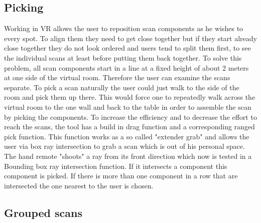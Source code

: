 \documentclass[hyperref,english,bachelorofscience,bibnum]{cgvpub}
\begin{document}
\subsection{Picking}

Working in VR allows the user to reposition scan components as he wishes to every spot. To align them they need to get close together but if they start already close together they do not look ordered and users tend to split them first, to see the individual scans at least before putting them back together. To solve this problem, all scan components start in a line at a fixed height of about 2 meters at one side of the virtual room. Therefore the user can examine the scans separate.
To pick a scan naturally the user could just walk to the side of the room and pick them up there. This would force one to repeatedly walk across the virtual room to the one wall and back to the table in order to assemble the scan by picking the components. To increase the efficiency and to decrease the effort to reach the scans, the tool has a build in drag function and a corresponding ranged pick function. This function works as a so called "extender grab"\cite{Jerald2015} %
and allows the user via box ray intersection to grab a scan which is out of his personal space.
The hand remote "shoots" a ray from its front direction which now is tested in a Bounding box ray intersection function. If it intersects a component this component is picked.
If there is more than one component in a row that are intersected the one nearest to the user is chosen. 

\subsection{Grouped scans}
\end{document}

